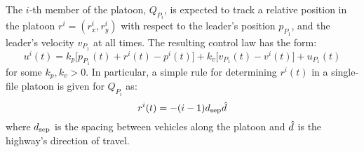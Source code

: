 The $i$-th member of the platoon, $Q_{P_i}$, is expected to track a relative position in the platoon $r^i = (r_x^i,r_y^i)$ with respect to the leader's position $p_{P_1}$, and the leader's velocity $v_{P_1}$ at all times. The resulting control law has the form:
\begin{equation}\label{eq:follow}
u^i(t) = k_p \big[p_{P_1}(t) + r^i(t) - p^i(t) \big] + k_v\big[v_{P_1}(t) - v^i(t)\big] + u_{P_1}(t)
\end{equation}
for some $k_p,k_v>0$. In particular, a simple rule for determining $r^i(t)$ in a single-file platoon is given for $Q_{P_i}$ as:
\begin{equation}\label{eq:nominal_pos}
r^i(t) = - (i-1) d_\text{sep} \hat{d}
\end{equation}
where $d_\text{sep}$ is the spacing between vehicles along the platoon and $\hat{d}$ is the highway's direction of travel.